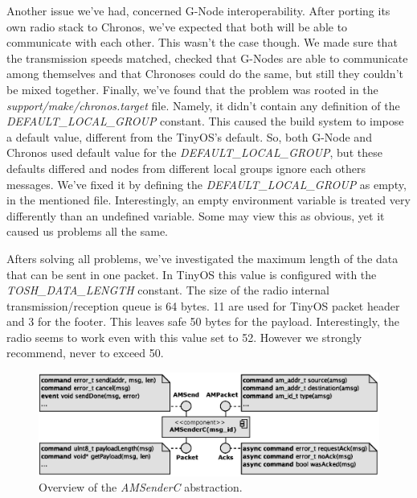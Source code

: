 Another issue we've had, concerned G-Node interoperability. After porting its own radio stack to Chronos, we've expected that both will be able to communicate with each other. This wasn't the case though. We made sure that the transmission speeds matched, checked that G-Nodes are able to communicate among themselves and that Chronoses could do the same, but still they couldn't be mixed together. Finally, we've found that the problem was rooted in the \emph{support/make/chronos.target} file. Namely, it didn't contain any definition of the \emph{DEFAULT\_LOCAL\_GROUP} constant. This caused the build system to impose a default value, different from the TinyOS's default. So, both G-Node and Chronos used default value for the \emph{DEFAULT\_LOCAL\_GROUP}, but these defaults differed and nodes from different local groups ignore each others messages. We've fixed it by defining the \emph{DEFAULT\_LOCAL\_GROUP} as empty, in the mentioned file. Interestingly, an empty environment variable is treated very differently than an undefined variable. Some may view this as obvious, yet it caused us problems all the same.

Afters solving all problems, we've investigated the maximum length of the data that can be sent in one packet. In TinyOS this value is configured with the \emph{TOSH\_DATA\_LENGTH} constant. The size of the radio internal transmission/reception queue is 64 bytes. 11 are used for TinyOS packet header and 3 for the footer. This leaves safe 50 bytes for the payload. Interestingly, the radio seems to work even with this value set to 52. However we strongly recommend, never to exceed 50.

\begin{figure}[h]
  \centering
  \includegraphics[width=1.0\textwidth]{diagrams/am_sender_c.eps}
  \caption{Overview of the \emph{AMSenderC} abstraction.}
  \label{fig:am_sender_c}
\end{figure}

